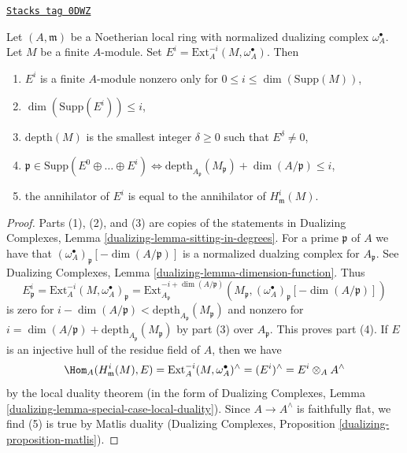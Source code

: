 \begin{lemma}
\label{local-cohomology-lemma-sitting-in-degrees}
\href{https://stacks.math.columbia.edu/tag/0DWZ}{\texttt{Stacks tag 0DWZ}}

Let $(A, \mathfrak m)$ be a Noetherian local ring with
normalized dualizing complex $\omega_A^\bullet$.
Let $M$ be a finite $A$-module.
Set $E^i = \text{Ext}_A^{-i}(M, \omega_A^\bullet)$.
Then
\begin{enumerate}
\item $E^i$ is a finite $A$-module nonzero only for
$0 \leq i \leq \dim(\text{Supp}(M))$,
\item $\dim(\text{Supp}(E^i)) \leq i$,
\item $\text{depth}(M)$ is the smallest integer $\delta \geq 0$ such that
$E^\delta \not = 0$,
\item $\mathfrak p \in \text{Supp}(E^0 \oplus \ldots \oplus E^i)
\Leftrightarrow
\text{depth}_{A_\mathfrak p}(M_\mathfrak p) + \dim(A/\mathfrak p) \leq i$,
\item the annihilator of $E^i$ is equal to the annihilator
of $H^i_\mathfrak m(M)$.
\end{enumerate}
\end{lemma}

\begin{proof}
Parts (1), (2), and (3) are copies of the statements in
Dualizing Complexes, Lemma \ref{dualizing-lemma-sitting-in-degrees}.
For a prime $\mathfrak p$ of $A$ we have that
$(\omega_A^\bullet)_\mathfrak p[-\dim(A/\mathfrak p)]$
is a normalized dualzing complex for $A_\mathfrak p$.
See Dualizing Complexes, Lemma \ref{dualizing-lemma-dimension-function}.
Thus
$$
E^i_\mathfrak p =
\text{Ext}^{-i}_A(M, \omega_A^\bullet)_\mathfrak p =
\text{Ext}^{-i + \dim(A/\mathfrak p)}_{A_\mathfrak p}
(M_\mathfrak p, (\omega_A^\bullet)_\mathfrak p[-\dim(A/\mathfrak p)])
$$
is zero for
$i - \dim(A/\mathfrak p) < \text{depth}_{A_\mathfrak p}(M_\mathfrak p)$
and nonzero for
$i = \dim(A/\mathfrak p) + \text{depth}_{A_\mathfrak p}(M_\mathfrak p)$
by part (3) over $A_\mathfrak p$.
This proves part (4).
If $E$ is an injective hull of the residue field of $A$, then we have
$$
\Hom_A(H^i_\mathfrak m(M), E) =
\text{Ext}^{-i}_A(M, \omega_A^\bullet)^\wedge =
(E^i)^\wedge =
E^i \otimes_A A^\wedge
$$
by the local duality theorem (in the form of
Dualizing Complexes, Lemma \ref{dualizing-lemma-special-case-local-duality}).
Since $A \to A^\wedge$ is faithfully flat, we find (5) is true by
Matlis duality
(Dualizing Complexes, Proposition \ref{dualizing-proposition-matlis}).
\end{proof}

